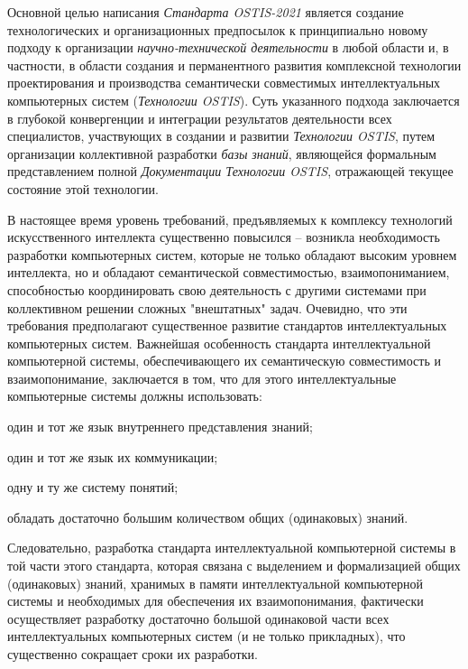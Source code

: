 \begin{SCn}
{\begin{scnitemize}
		Основной целью написания \textit{Стандарта OSTIS-2021} является создание технологических и организационных предпосылок к принципиально новому  подходу к организации \textit{научно-технической деятельности} в любой области и, в частности, в области создания и перманентного развития комплексной технологии проектирования и производства семантически совместимых интеллектуальных компьютерных систем (\textit{Технологии OSTIS}). Суть указанного подхода заключается  в глубокой конвергенции и интеграции результатов деятельности всех специалистов, участвующих в создании и развитии \textit{Технологии OSTIS}, путем организации коллективной разработки \textit{базы знаний}, являющейся формальным представлением полной \textit{Документации Технологии OSTIS}, отражающей текущее состояние этой технологии.
	\end{scnitemize}
В настоящее время уровень требований, предъявляемых к комплексу технологий искусственного интеллекта существенно повысился -- возникла необходимость разработки компьютерных систем, которые не только обладают высоким уровнем интеллекта, но и обладают семантической совместимостью, взаимопониманием, способностью координировать свою деятельность с другими системами при коллективном решении сложных "внештатных"{} задач. Очевидно, что эти требования предполагают существенное развитие стандартов интеллектуальных компьютерных систем. Важнейшая особенность стандарта интеллектуальной компьютерной системы, обеспечивающего их семантическую совместимость и взаимопонимание, заключается в том, что для этого интеллектуальные компьютерные системы должны использовать:
\begin{scnitemize}
	\item  один и тот же язык внутреннего представления знаний;
	\item  один и тот же язык их коммуникации;
	\item  одну и ту же систему понятий;
	\item  обладать достаточно большим количеством  общих (одинаковых) знаний.
\end{scnitemize}

Следовательно, разработка стандарта интеллектуальной компьютерной системы в той части этого стандарта, которая связана с выделением и формализацией общих (одинаковых) знаний, хранимых в памяти интеллектуальной компьютерной системы и необходимых для обеспечения их взаимопонимания, фактически осуществляет разработку достаточно большой  одинаковой части всех интеллектуальных компьютерных систем   (и не только прикладных),  что существенно  сокращает сроки их разработки.

}
\end{SCn}
